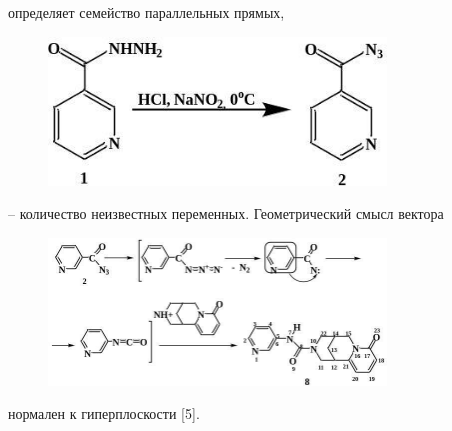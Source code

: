 определяет семейство параллельных прямых,
\begin{figure}[H]
	\centering
	\includegraphics[width=0.8\textwidth]{assets/1}
	\caption*{}
\end{figure} -- количество неизвестных переменных.
Геометрический смысл вектора \begin{figure}[H]
	\centering
	\includegraphics[width=0.8\textwidth]{assets/10}
	\caption*{}
\end{figure}
нормален к гиперплоскости {[}5{]}.

